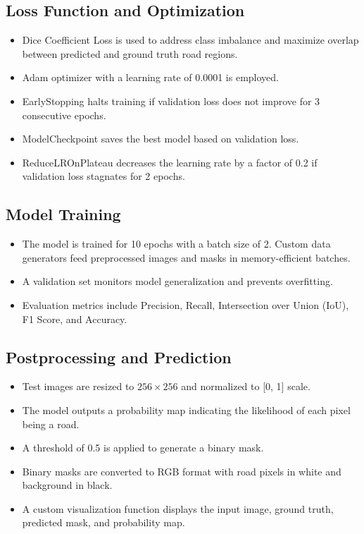 \documentclass[conference]{IEEEtran}
\begin{document}
\subsection{Loss Function and Optimization}

\begin{itemize}
    \item Dice Coefficient Loss is used to address class imbalance and maximize overlap between predicted and ground truth road regions.
    \item Adam optimizer with a learning rate of 0.0001 is employed.
    \item EarlyStopping halts training if validation loss does not improve for 3 consecutive epochs.
    \item ModelCheckpoint saves the best model based on validation loss.
    \item ReduceLROnPlateau decreases the learning rate by a factor of 0.2 if validation loss stagnates for 2 epochs.
\end{itemize}

\subsection{Model Training}

\begin{itemize}
    \item The model is trained for 10 epochs with a batch size of 2. Custom data generators feed preprocessed images and masks in memory-efficient batches.
    \item A validation set monitors model generalization and prevents overfitting.
    \item Evaluation metrics include Precision, Recall, Intersection over Union (IoU), F1 Score, and Accuracy.
\end{itemize}

\subsection{Postprocessing and Prediction}

\begin{itemize}
    \item Test images are resized to $256 \times 256$ and normalized to [0, 1] scale.
    \item The model outputs a probability map indicating the likelihood of each pixel being a road.
    \item A threshold of 0.5 is applied to generate a binary mask.
    \item Binary masks are converted to RGB format with road pixels in white and background in black.
    \item A custom visualization function displays the input image, ground truth, predicted mask, and probability map.
\end{itemize}
\end{document}
